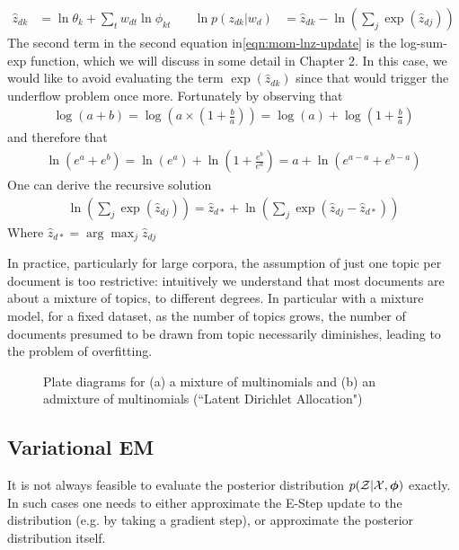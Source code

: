 \begin{align}
\hat{z}_{dk} & = \ln \theta_k + \sum_t w_{dt} \ln \phi_{kt}\quad & 
\ln p(z_{dk} | w_d) & = \hat{z}_{dk} - \ln (\sum_j \exp(\hat{z}_{dj})) \label{eqn:mom-lnz-update}
\end{align}
The second term in the second equation in\eqref{eqn:mom-lnz-update} is the log-sum-exp function, which we will discuss in some detail in Chapter 2. In this case, we would like to avoid evaluating the term $\exp(\hat{z}_{dk})$ since that would trigger the underflow problem once more. Fortunately by observing that
\begin{align}
\log(a + b) = \log(a \times (1 + \frac{b}{a})) = \log(a) + \log (1 + \frac{b}{a})
\end{align}
and therefore that
\begin{align}
\ln(e^a + e^b) = \ln (e^a) + \ln (1 + \frac{e^b}{e^a}) = a + \ln(e^{a-a} + e^{b-a})
\end{align}
One can derive the recursive solution
\begin{align}
\ln(\sum_j \exp(\hat{z}_{dj})) = \hat{z}_{d*} + \ln(\sum_j \exp(\hat{z}_{dj} - \hat{z}_{d*}))
\end{align}
Where $\hat{z}_{d*} = \arg \max_j \hat{z}_{dj}$

In practice, particularly for large corpora, the assumption of just one topic per document is too restrictive: intuitively we understand that most documents are about a mixture of topics, to different degrees. In particular with a mixture model, for a fixed dataset, as the number of topics grows, the number of documents presumed to be drawn from topic necessarily diminishes, leading to the problem of overfitting.

\begin{figure}
\centering
    \subfigure[]{
        \resizebox{0.4\textwidth}{0.20\textwidth}{
            
        }
    }
    \subfigure[]{
        \resizebox{0.4\textwidth}{0.20\textwidth}{
            
        }
    }

    \caption{Plate diagrams for (a) a mixture of multinomials and (b) an admixture of multinomials (``Latent Dirichlet Allocation")}
\label{fig:plates}
\end{figure}


\subsection{Variational EM}
It is not always feasible to evaluate the posterior distribution $p({ \mathcal{Z} }|{ \mathcal{X} }, { \bm \phi })$ exactly. In such cases one needs to either approximate the E-Step update to the distribution (e.g. by taking a gradient step\cite{Cappe2009}), or approximate the posterior distribution itself.


